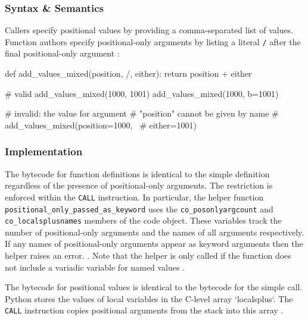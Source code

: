 \subsubsection{Syntax \& Semantics}
Callers specify positional values by providing a comma-separated list of values.
Function authors specify positional-only arguments by listing a literal \texttt{/} after
the final positional-only argument
\parencite[][reference/compound\_stmts.html section 8.7 "Function Definitions"]{python-doc-html}:

\begin{pygmented}[lang=python]
def add_values_mixed(position, /, either):
    return position + either

# valid
add_values_mixed(1000, 1001)
add_values_mixed(1000, b=1001)

# invalid: the value for argument
# "position" cannot be given by name
# add_values_mixed(position=1000, \
#                  either=1001)
\end{pygmented}

\subsubsection{Implementation}
The bytecode for function definitions is identical to the simple definition regardless of
the presence of positional-only arguments.
The restriction is enforced within the \texttt{CALL} instruction.
In particular, the helper function \texttt{positional\_only\_passed\_as\_keyword} uses the
\texttt{co\_posonlyargcount} and \texttt{co\_localsplusnames} members of the code object.
These variables track the number of positional-only arguments
\parencite[][Doc/library/inspect.rst lines 180-181]{python-source}
and the names of all arguments
\parencite[][Include/cpython/code.h line 155]{python-source}
respectively.
If any names of positional-only arguments appear as keyword arguments then the helper
raises an error.
\parencite[][Python/ceval.c lines 1182-1244]{python-source}.
Note that the helper is only called if the function does not include a variadic variable
for named values
\parencite[][Python/ceval.c lines 1417-1431]{python-source}.

The bytecode for positional values is identical to the bytecode for the simple call.
Python stores the values of local variables in the C-level array `localsplus`.
The \texttt{CALL} instruction copies positional arguments from the stack into this array
\parencite[][Python/ceval.c lines 1341-1353]{python-source}.

